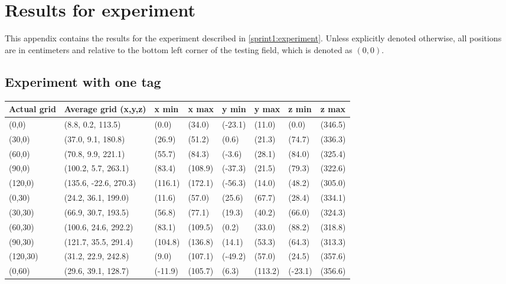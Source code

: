 \chapter{Results for experiment}
\label{app:experiment}
This appendix contains the results for the experiment described in \autoref{sprint1:experiment}.
Unless explicitly denoted otherwise, all positions are in centimeters and relative to the bottom left corner of the testing field, which is denoted as $(0,0)$.

\section*{Experiment with one tag}
\label{app:one-tag}
\begin{table}[H]
    \begin{tabular}{|l|l|l|l|l|l|l|l|}
        \hline
        Actual grid & Average grid (x,y,z)  & x min   & x max   & y min   & y max   & z min   & z max   \\ \hline
        (0,0)       & (8.8, 0.2, 113.5)     & (0.0)   & (34.0)  & (-23.1) & (11.0)  & (0.0)   & (346.5) \\ \hline
        (30,0)      & (37.0, 9.1, 180.8)    & (26.9)  & (51.2)  & (0.6)   & (21.3)  & (74.7)  & (336.3) \\ \hline
        (60,0)      & (70.8, 9.9, 221.1)    & (55.7)  & (84.3)  & (-3.6)  & (28.1)  & (84.0)  & (325.4) \\ \hline
        (90,0)      & (100.2, 5.7, 263.1)   & (83.4)  & (108.9) & (-37.3) & (21.5)  & (79.3)  & (322.6) \\ \hline
        (120,0)     & (135.6, -22.6, 270.3) & (116.1) & (172.1) & (-56.3) & (14.0)  & (48.2)  & (305.0) \\ \hline
        (0,30)      & (24.2, 36.1, 199.0)   & (11.6)  & (57.0)  & (25.6)  & (67.7)  & (28.4)  & (334.1) \\ \hline
        (30,30)     & (66.9, 30.7, 193.5)   & (56.8)  & (77.1)  & (19.3)  & (40.2)  & (66.0)  & (324.3) \\ \hline
        (60,30)     & (100.6, 24.6, 292.2)  & (83.1)  & (109.5) & (0.2)   & (33.0)  & (88.2)  & (318.8) \\ \hline
        (90,30)     & (121.7, 35.5, 291.4)  & (104.8) & (136.8) & (14.1)  & (53.3)  & (64.3)  & (313.3) \\ \hline
        (120,30)    & (31.2, 22.9, 242.8)   & (9.0)   & (107.1) & (-49.2) & (57.0)  & (24.5)  & (357.6) \\ \hline
        (0,60)      & (29.6, 39.1, 128.7)   & (-11.9) & (105.7) & (6.3)   & (113.2) & (-23.1) & (356.6) \\ \hline

\end{tabular}
\end{table}
